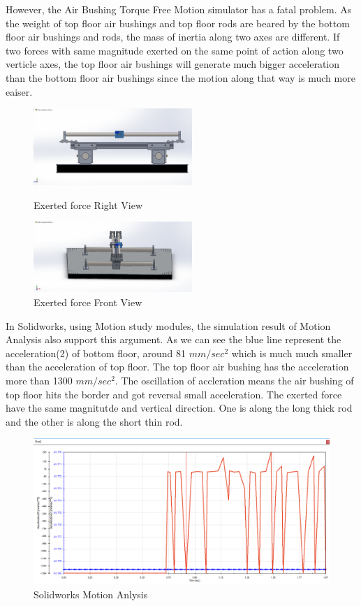 However, the Air Bushing Torque Free Motion simulator has a fatal problem. As the weight of top floor air bushings and top floor rods are beared by the bottom floor air bushings and rods, the mass of inertia along two axes are different. If two forces with same magnitude exerted on the same point of action along two verticle axes, the top floor air bushings will generate much bigger acceleration than the bottom floor air bushings since the motion along that way is much more eaiser.


\begin{figure}[H]\label{DOE-force}
\centering
\begin{minipage}[t]{0.48\textwidth}
\centering
\includegraphics[width=6cm]{fig/DOE/Rightforce}
\caption{Exerted force Right View}
\end{minipage}
\begin{minipage}[t]{0.48\textwidth}
\centering
\includegraphics[width=6cm]{fig/DOE/ForwardForce}
\caption{Exerted force Front View}
\end{minipage}
\end{figure}


In Solidworks, using Motion study modules, the simulation result of Motion Analysis also support this argument. As we can see the blue line represent the acceleration(2) of bottom floor, around 81 $mm/sec^2$ which is much much smaller than the aceeleration of top floor. The top floor air bushing has the acceleration more than 1300 $mm/sec^2$. The oscillation of accleration means the air bushing of top floor hits the border and got reversal small acceleration. The exerted force have the same magnitutde and vertical direction. One is along the long thick rod and the other is along the short thin rod.


\begin{figure}[H]
\centering
\includegraphics[width=\linewidth]{fig/DOE/MotionAnalysis}
\caption{Solidworks Motion Anlysis} 
\end{figure} 

